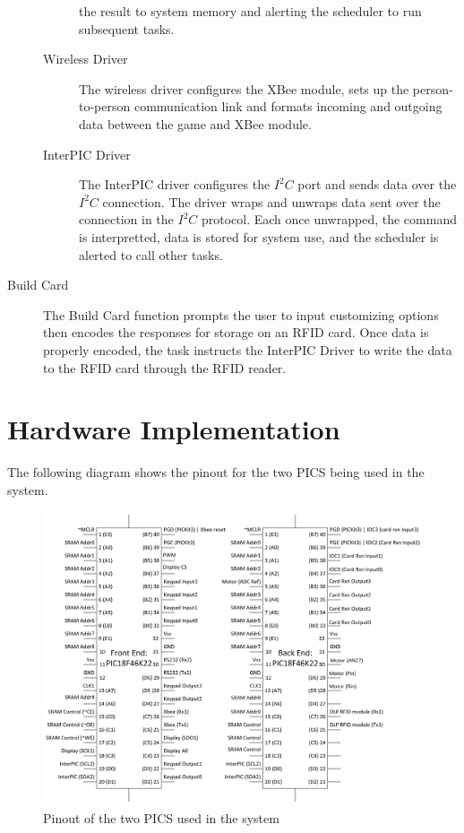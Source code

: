 \documentclass[12pt]{article} %
\begin{document}
\begin{description}
\begin{description}
				the result to system memory and alerting the scheduler to run
				subsequent tasks.
			\item[Wireless Driver] The wireless driver configures the XBee module,
				sets up the person-to-person communication link and formats incoming
				and outgoing data between the game and XBee module.
			\item[InterPIC Driver] The InterPIC driver configures the $I^2C$ port and
				sends data over the $I^2C$ connection. The driver wraps and unwraps
				data sent over the connection in the $I^2C$ protocol. Each once
				unwrapped, the command is interpretted, data is stored for system use,
				and the scheduler is alerted to call other tasks.
		\end{description}
	\item[Build Card] The Build Card function prompts the user to input
		customizing options then encodes the responses for storage on an RFID card.
		Once data is properly encoded, the task instructs the InterPIC Driver to
		write the data to the RFID card through the RFID reader.
\end{description}

\section{Hardware Implementation}\label{hwImplementation} 

The following diagram shows the pinout for the two PICS being used in the system.

\begin{figure}[H]
	\centering
	\includegraphics[width=\textwidth]{images/PinOuts.png}
	\caption{Pinout of the two PICS used in the system}
	\label{fig:hardwarediagram}
\end{figure}
\end{document}
